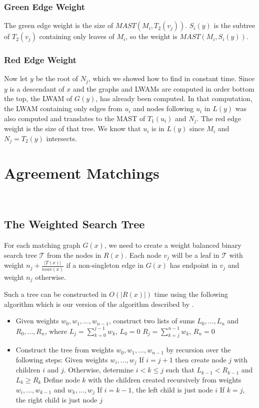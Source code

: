 \subsubsection{Green Edge Weight}
The green edge weight is the size of $MAST(M_i,T_2(v_j))$. $S_i(y)$ is the subtree of $T_2(v_j)$ containing only leaves of $M_i$, so the weight is $MAST(M_i, S_i(y))$.

\subsubsection{Red Edge Weight}
Now let $y$ be the root of $N_j$, which we showed how to find in constant time. Since $y$ is a descendant of $x$ and the graphs and LWAMs are computed in order bottom the top, the LWAM of $G(y)$, has already been computed. In that computation, the LWAM containing only edges from $u_i$ and nodes following $u_i$ in $L(y)$ was also computed and translates to the MAST of $T_1(u_i)$ and $N_j$. The red edge weight is the size of that tree. We know that $u_i$ is in $L(y)$ since $M_i$ and $N_j = T_2(y)$ intersects.

\section{Agreement Matchings}
\\

\subsection{The Weighted Search Tree}
For each matching graph $G(x)$, we need to create a weight balanced binary search tree $\mathcal{T}$ from the nodes in $R(x)$. Each node $v_j$ will be a leaf in $\mathcal{T}$ with weight $n_j + \frac{|T(x)|}{nsav(x)}$ if a non-singleton edge in $G(x)$ has endpoint in $v_j$ and weight $n_j$ otherwise.

Such a tree can be constructed in $O(|R(x)|)$ time using the following algorithm which is our version of the algorithm described by .

\begin{itemize}
	\item Given weights ${w_0, w_1, ..., w_{n-1}}$, construct two lists of sums ${L_0, ..., L_{n}}$ and ${R_0, ..., R_{n}}$, where
	\subitem $L_j=\sum_{k=0}^{j-1} w_k$, $L_0=0$
	\subitem $R_j=\sum_{k=j}^{n-1} w_k$, $R_{n}=0$
	\item Construct the tree from weights ${w_0, w_1, ..., w_{n-1}}$ by recursion over the following steps:
	\subitem Given weights ${w_i, ..., w_j}$
	\subitem If $i=j+1$ then create node $j$ with children $i$ and $j$.
	\subitem Otherwise, determine $i<k\le j$ such that
	\subsubitem $L_{k-1} < R_{k-1}$ and $L_k \ge R_k$
	\subitem Define node $k$ with the children created recursively from weights
	\subsubitem ${w_i, ..., w_{k-1}}$ and ${w_k, ..., w_j}$
	\subsubitem If $i=k-1$, the left child is just node $i$
	\subsubitem If $k=j$, the right child is just node $j$
\end{itemize}

